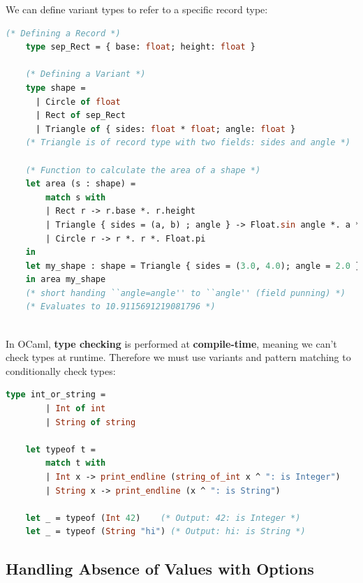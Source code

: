 \begin{Def}

    We can define variant types to refer to a specific record type:

    \begin{lstlisting}[language=OCaml, caption={Variants Carrying Record Fields}, numbers=none]
    (* Defining a Record *)
    type sep_Rect = { base: float; height: float }

    (* Defining a Variant *)
    type shape = 
      | Circle of float
      | Rect of sep_Rect
      | Triangle of { sides: float * float; angle: float }
    (* Triangle is of record type with two fields: sides and angle *)

    (* Function to calculate the area of a shape *)
    let area (s : shape) =
        match s with
        | Rect r -> r.base *. r.height
        | Triangle { sides = (a, b) ; angle } -> Float.sin angle *. a *. b
        | Circle r -> r *. r *. Float.pi
    in 
    let my_shape : shape = Triangle { sides = (3.0, 4.0); angle = 2.0 }
    in area my_shape
    (* short handing ``angle=angle'' to ``angle'' (field punning) *)
    (* Evaluates to 10.9115691219081796 *)
    
    \end{lstlisting}
\end{Def}

\begin{Def}

    In OCaml, \textbf{type checking} is performed at \textbf{compile-time}, meaning we can't check types at runtime. Therefore we 
    must use variants and pattern matching to conditionally check types:

    \begin{lstlisting}[language=OCaml, caption={Using Variants for Type Checking}, numbers=none]
    type int_or_string =
        | Int of int
        | String of string

    let typeof t =
        match t with
        | Int x -> print_endline (string_of_int x ^ ": is Integer")
        | String x -> print_endline (x ^ ": is String")

    let _ = typeof (Int 42)    (* Output: 42: is Integer *)
    let _ = typeof (String "hi") (* Output: hi: is String *)
    \end{lstlisting}
\end{Def}


\newpage 

\subsection{Handling Absence of Values with Options}

